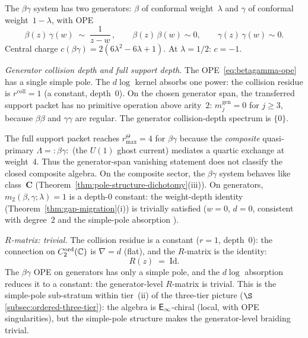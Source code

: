 \begin{computation}%
\label{comp:betagamma-ordered-bar}%
%
%
%
The $\beta\gamma$ system has two generators:
$\beta$ of conformal weight~$\lambda$ and
$\gamma$ of conformal weight~$1-\lambda$, with OPE
\begin{equation}\label{eq:betagamma-ope}
\beta(z)\,\gamma(w)
\;\sim\;
\frac{1}{z-w}\,,
\qquad
\beta(z)\,\beta(w) \sim 0,
\qquad
\gamma(z)\,\gamma(w) \sim 0.
\end{equation}
Central charge $c(\beta\gamma) = 2(6\lambda^2 - 6\lambda + 1)$.
At $\lambda = 1/2$: $c = -1$.

\smallskip
\noindent
\emph{Generator collision depth and full support depth.}
The OPE~\eqref{eq:betagamma-ope} has a single simple pole.
The $d\log$ kernel absorbs one power: the
collision residue is $r^{\mathrm{coll}} = 1$ (a constant,
depth~$0$). On the chosen generator span, the transferred support
packet has no primitive operation above arity~$2$:
$m^{\mathrm{gen}}_j=0$ for $j\ge3$, because
$\beta\beta$ and $\gamma\gamma$ are regular.
The generator collision-depth spectrum is $\{0\}$.

The full support packet reaches $r^\Theta_{\max}=4$ for $\beta\gamma$
because the \emph{composite} quasi-primary
$\Lambda = {:}\beta\gamma{:}$ (the $U(1)$ ghost current)
mediates a quartic exchange at weight~$4$. Thus the generator-span
vanishing statement does not classify the closed composite algebra. On the
composite sector, the $\beta\gamma$ system behaves like
class~$\mathbf{C}$
(Theorem~\ref{thm:pole-structure-dichotomy}(iii)).
On generators, $m_2(\beta,\gamma;\lambda) = 1$ is a depth-$0$ constant: the weight-depth identity (Theorem~\ref{thm:gap-migration}(i)) is trivially satisfied ($w = 0$, $d = 0$, consistent with degree~$2$ and the simple-pole absorption ).

\smallskip
\noindent
\emph{$R$-matrix: trivial.}
The collision residue is a constant ($r = 1$, depth~$0$):
the connection on $C_2^{\mathrm{ord}}(\mathbb{C})$ is
$\nabla = d$ (flat), and the $R$-matrix is the identity:
\begin{equation}\label{eq:betagamma-R}
R(z) \;=\; \mathrm{Id}.
\end{equation}
The $\beta\gamma$ OPE on generators has only a simple pole,
and the $d\log$ absorption reduces it to a constant:
the generator-level $R$-matrix is trivial. This is the
simple-pole sub-stratum within tier~(ii) of the three-tier
picture ($\S$\ref{subsec:ordered-three-tier}):
the algebra is $\mathsf{E}_{\infty}$-chiral (local, with OPE singularities),
but the simple-pole structure makes the generator-level
braiding trivial.


\end{computation}
